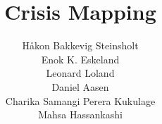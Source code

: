 \documentclass[pdftex,12pt,final,a4paper]{report}
\author{Håkon Bakkevig Steinsholt \\
Enok K. Eskeland \\
Leonard Loland \\
Daniel Aasen \\
Charika Samangi Perera Kukulage \\
Mahsa Hassankashi }
\begin{document}
\title{Crisis Mapping}
\maketitle







%
%

\tableofcontents 

\listoffigures







%
%
%
%
%
%
%








%	
%	




%
%
\end{document}
